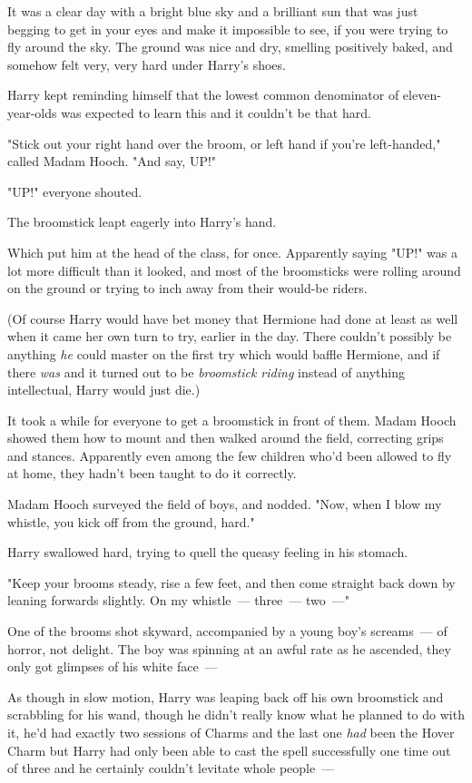 It was a clear day with a bright blue sky and a brilliant sun that was just
begging to get in your eyes and make it impossible to see, if you were trying
to fly around the sky. The ground was nice and dry, smelling positively baked,
and somehow felt very, very hard under Harry's shoes.

Harry kept reminding himself that the lowest common denominator of
eleven-year-olds was expected to learn this and it couldn't be that hard.

"Stick out your right hand over the broom, or left hand if you're left-handed,"
called Madam Hooch. "And say, UP!"

"UP!" everyone shouted.

The broomstick leapt eagerly into Harry's hand.

Which put him at the head of the class, for once. Apparently saying "UP!" was a
lot more difficult than it looked, and most of the broomsticks were rolling
around on the ground or trying to inch away from their would-be riders.

(Of course Harry would have bet money that Hermione had done at least as well
when it came her own turn to try, earlier in the day. There couldn't possibly
be anything \emph{he} could master on the first try which would baffle
Hermione, and if there \emph{was} and it turned out to be \emph{broomstick
riding} instead of anything intellectual, Harry would just die.)

It took a while for everyone to get a broomstick in front of them. Madam Hooch
showed them how to mount and then walked around the field, correcting grips and
stances. Apparently even among the few children who'd been allowed to fly at
home, they hadn't been taught to do it correctly.

Madam Hooch surveyed the field of boys, and nodded. "Now, when I blow my
whistle, you kick off from the ground, hard."

Harry swallowed hard, trying to quell the queasy feeling in his stomach.

"Keep your brooms steady, rise a few feet, and then come straight back down by
leaning forwards slightly. On my whistle~--- three~--- two~---"

One of the brooms shot skyward, accompanied by a young boy's screams~--- of
horror, not delight. The boy was spinning at an awful rate as he ascended, they
only got glimpses of his white face~---

As though in slow motion, Harry was leaping back off his own broomstick and
scrabbling for his wand, though he didn't really know what he planned to do
with it, he'd had exactly two sessions of Charms and the last one \emph{had}
been the Hover Charm but Harry had only been able to cast the spell
successfully one time out of three and he certainly couldn't levitate whole
people~---

